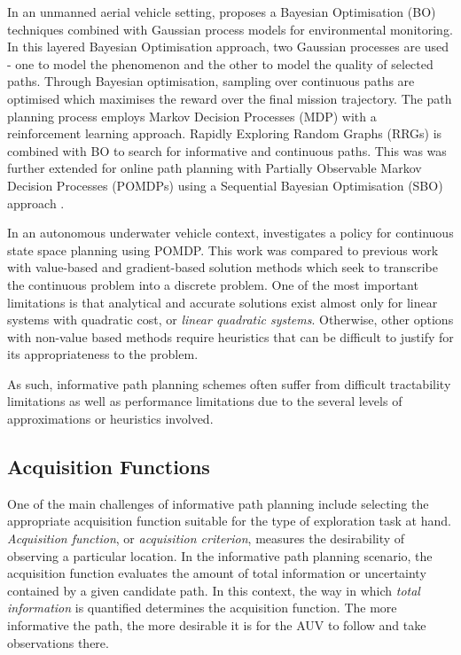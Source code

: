 			In an unmanned aerial vehicle setting, \cite{Roman:BayesianOptimisation} proposes a Bayesian Optimisation (BO) techniques combined with Gaussian process models for environmental monitoring. In this layered Bayesian Optimisation approach, two Gaussian processes are used - one to model the phenomenon and the other to model the quality of selected paths. Through Bayesian optimisation, sampling over continuous paths are optimised which maximises the reward over the final mission trajectory. The path planning process employs Markov Decision Processes (MDP) with a reinforcement learning approach. Rapidly Exploring Random Graphs (RRGs) is combined with BO to search for informative and continuous paths. This was was further extended for online path planning with Partially Observable Markov Decision Processes (POMDPs) using a Sequential Bayesian Optimisation (SBO) approach \citep{Roman:SequentialBayesianOptimisation}.
			
			In an autonomous underwater vehicle context, \cite{ParametricPOMDP} investigates a policy for continuous state space planning using POMDP. This work was compared to previous work with value-based and gradient-based solution methods which seek to transcribe the continuous problem into a discrete problem. One of the most important limitations is that analytical and accurate solutions exist almost only for linear systems with quadratic cost, or \textit{linear quadratic systems}. Otherwise, other options with non-value based methods require heuristics that can be difficult to justify for its appropriateness to the problem. 
			
			As such, informative path planning schemes often suffer from difficult tractability limitations as well as performance limitations due to the several levels of approximations or heuristics involved.
		
		\subsection{Acquisition Functions}
		\label{Background:RelatedWork:AcquisitionFunctions}
		
			One of the main challenges of informative path planning include selecting the appropriate acquisition function suitable for the type of exploration task at hand. \textit{Acquisition function}, or \textit{acquisition criterion}, measures the desirability of observing a particular location. In the informative path planning scenario, the acquisition function evaluates the amount of total information or uncertainty contained by a given candidate path. In this context, the way in which \textit{total information} is quantified determines the acquisition function. The more informative the path, the more desirable it is for the AUV to follow and take observations there.
	
